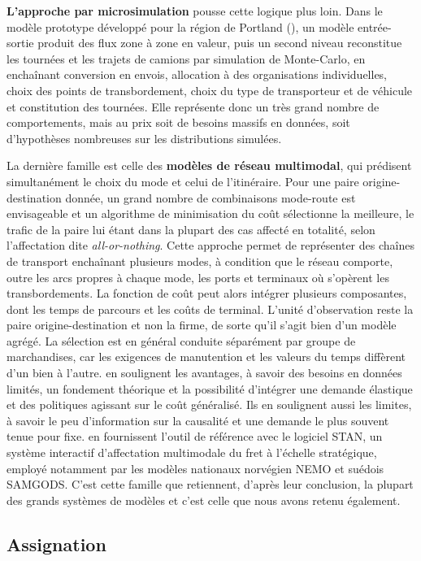 \documentclass[12pt,a4paper,french]{report}
\begin{document}
	\textbf{L'approche par microsimulation} pousse cette logique plus loin. Dans le modèle prototype développé pour la région de Portland (\cite{Neffendorf2001}), un modèle entrée-sortie produit des flux zone à zone en valeur, puis un second niveau reconstitue les tournées et les trajets de camions par simulation de Monte-Carlo, en enchaînant conversion en envois, allocation à des organisations individuelles, choix des points de transbordement, choix du type de transporteur et de véhicule et constitution des tournées. Elle représente donc un très grand nombre de comportements, mais au prix soit de besoins massifs en données, soit d'hypothèses nombreuses sur les distributions simulées.

	La dernière famille est celle des \textbf{modèles de réseau multimodal}, qui prédisent simultanément le choix du mode et celui de l'itinéraire. Pour une paire origine-destination donnée, un grand nombre de combinaisons mode-route est envisageable et un algorithme de minimisation du coût sélectionne la meilleure, le trafic de la paire lui étant dans la plupart des cas affecté en totalité, selon l'affectation dite \emph{all-or-nothing}. Cette approche permet de représenter des chaînes de transport enchaînant plusieurs modes, à condition que le réseau comporte, outre les arcs propres à chaque mode, les ports et terminaux où s'opèrent les transbordements. La fonction de coût peut alors intégrer plusieurs composantes, dont les temps de parcours et les coûts de terminal. L'unité d'observation reste la paire origine-destination et non la firme, de sorte qu'il s'agit bien d'un modèle agrégé. La sélection est en général conduite séparément par groupe de marchandises, car les exigences de manutention et les valeurs du temps diffèrent d'un bien à l'autre. \cite{deJong2004} en soulignent les avantages, à savoir des besoins en données limités, un fondement théorique et la possibilité d'intégrer une demande élastique et des politiques agissant sur le coût généralisé. Ils en soulignent aussi les limites, à savoir le peu d'information sur la causalité et une demande le plus souvent tenue pour fixe. \cite{Crainic1990} en fournissent l'outil de référence avec le logiciel STAN, un système interactif d'affectation multimodale du fret à l'échelle stratégique, employé notamment par les modèles nationaux norvégien NEMO et suédois SAMGODS. C'est cette famille que retiennent, d'après leur conclusion, la plupart des grands systèmes de modèles et c'est celle que nous avons retenu également.

	\subsection{Assignation}
	\label{subsec:assignation}
\end{document}
